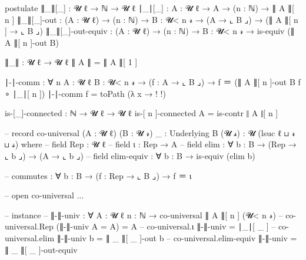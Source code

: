 \begin{code}

postulate
    ∥_∥[_] : 𝓤 ℓ → ℕ → 𝓤 ℓ
    ∣_∣[_] : {A : 𝓤 ℓ} → A → (n : ℕ) → ∥ A ∥[ n ]
    ∥_∥[_]-out : (A : 𝓤 ℓ) → (n : ℕ) → {B : 𝓤< n 𝓇} → (A → ⌞ B ⌟) → (∥ A ∥[ n ] → ⌞ B ⌟)
    ∥_∥[_]-out-equiv : (A : 𝓤 ℓ) → (n : ℕ) → {B : 𝓤< n 𝓇} → is-equiv (∥ A ∥[ n ]-out {B})

∥_∥ : 𝓤 ℓ → 𝓤 ℓ
∥ A ∥ = ∥ A ∥[ 1 ]

∣-∣-comm : ∀ {n} {A : 𝓤 ℓ} {B : 𝓤< n 𝓇} → (f : A → ⌞ B ⌟) → f ＝ (∥ A ∥[ n ]-out {B} f ∘ ∣_∣[ n ])
∣-∣-comm f = toPath (λ x → {!   !})

is-[_]-connected : ℕ → 𝓤 ℓ → 𝓤 ℓ
is-[ n ]-connected A = is-contr ∥ A ∥[ n ]

-- record co-universal (A : 𝓤 ℓ) (B : 𝓤 𝓇) {{_ : Underlying B (𝓤 𝓈)}} : 𝓤 (lsuc ℓ ⊔ 𝓇 ⊔ 𝓈) where
--     field Rep  : 𝓤 ℓ
--     field ι   : Rep → A
--     field elim : ∀ {b : B} → (Rep → ⌞ b ⌟) → (A → ⌞ b ⌟)
--     field elim-equiv : ∀ {b : B} → is-equiv (elim {b})

--     commutes : ∀ {b : B} → (f : Rep → ⌞ B ⌟) → f ＝ ι

-- open co-universal {{...}}

-- instance
--     ∥-∥-univ : ∀ {A : 𝓤 ℓ} {n : ℕ} → co-universal ∥ A ∥[ n ] (𝓤< n 𝓇)
--     co-universal.Rep (∥-∥-univ {A = A}) = A
--     co-universal.ι ∥-∥-univ = ∣_∣[ _ ]
--     co-universal.elim ∥-∥-univ {b} = ∥ _ ∥[ _ ]-out {b}
--     co-universal.elim-equiv ∥-∥-univ = ∥ _ ∥[ _ ]-out-equiv

 
  
\end{code} 